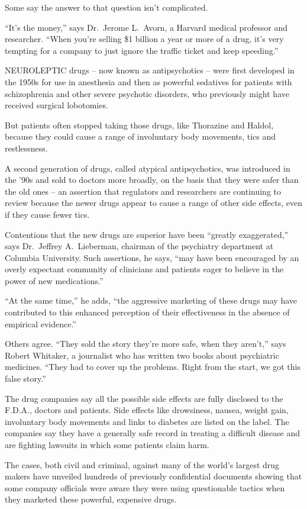 ﻿\documentclass[12pt]{article}
\begin{document}
Some say the answer to that question isn't complicated.

``It's the money,'' says Dr.~Jerome L.~Avorn, a Harvard medical professor and researcher. ``When
you're selling \$1 billion a year or more of a drug, it's very tempting for a company to just ignore
the traffic ticket and keep speeding.''

NEUROLEPTIC drugs -- now known as antipsychotics -- were first developed in the 1950s for use in
anesthesia and then as powerful sedatives for patients with schizophrenia and other severe psychotic
disorders, who previously might have received surgical lobotomies.

But patients often stopped taking those drugs, like Thorazine and Haldol, because they could cause a
range of involuntary body movements, tics and restlessness.

A second generation of drugs, called atypical antipsychotics, was introduced in the '90s and sold to
doctors more broadly, on the basis that they were safer than the old ones -- an assertion that
regulators and researchers are continuing to review because the newer drugs appear to cause a range
of other side effects, even if they cause fewer tics.

Contentions that the new drugs are superior have been ``greatly exaggerated,'' says Dr.~Jeffrey
A.~Lieberman, chairman of the psychiatry department at Columbia University. Such assertions, he
says, ``may have been encouraged by an overly expectant community of clinicians and patients eager
to believe in the power of new medications.''

``At the same time,'' he adds, ``the aggressive marketing of these drugs may have contributed to
this enhanced perception of their effectiveness in the absence of empirical evidence.''

Others agree. ``They sold the story they're more safe, when they aren't,'' says Robert Whitaker, a
journalist who has written two books about psychiatric medicines. ``They had to cover up the
problems. Right from the start, we got this false story.''

The drug companies say all the possible side effects are fully disclosed to the F.D.A., doctors and
patients. Side effects like drowsiness, nausea, weight gain, involuntary body movements and links to
diabetes are listed on the label. The companies say they have a generally safe record in treating a
difficult disease and are fighting lawsuits in which some patients claim harm.

The cases, both civil and criminal, against many of the world's largest drug makers have unveiled
hundreds of previously confidential documents showing that some company officials were aware they
were using questionable tactics when they marketed these powerful, expensive drugs.
\end{document}
